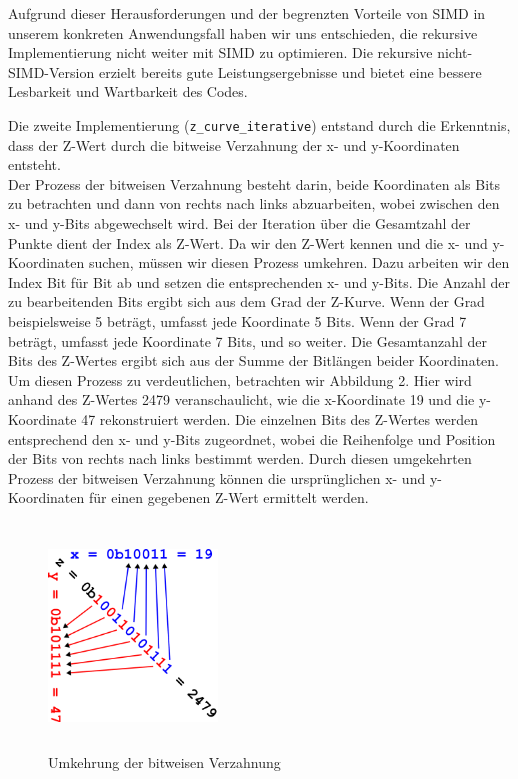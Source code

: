\documentclass[course=erap]{aspdoc}
\begin{document}
\noindent Aufgrund dieser Herausforderungen und der begrenzten Vorteile von SIMD in unserem konkreten Anwendungsfall haben wir uns entschieden, die rekursive Implementierung nicht weiter mit SIMD zu optimieren. Die rekursive nicht-SIMD-Version erzielt bereits gute Leistungsergebnisse und bietet eine bessere Lesbarkeit und Wartbarkeit des Codes.

\noindent Die zweite Implementierung (\texttt{z\_curve\_iterative}) entstand durch die Erkenntnis, dass der Z-Wert durch die bitweise Verzahnung der x- und y-Koordinaten entsteht. \\
Der Prozess der bitweisen Verzahnung besteht darin, beide Koordinaten als Bits zu betrachten und dann von rechts nach links abzuarbeiten, wobei zwischen den x- und y-Bits abgewechselt wird. Bei der Iteration über die Gesamtzahl der Punkte dient der Index als Z-Wert. Da wir den Z-Wert kennen und die x- und y-Koordinaten suchen, müssen wir diesen Prozess umkehren. Dazu arbeiten wir den Index Bit für Bit ab und setzen die entsprechenden x- und y-Bits. Die Anzahl der zu bearbeitenden Bits ergibt sich aus dem Grad der Z-Kurve. Wenn der Grad beispielsweise 5 beträgt, umfasst jede Koordinate 5 Bits. Wenn der Grad 7 beträgt, umfasst jede Koordinate 7 Bits, und so weiter. Die Gesamtanzahl der Bits des Z-Wertes ergibt sich aus der Summe der Bitlängen beider Koordinaten.\\
Um diesen Prozess zu verdeutlichen, betrachten wir Abbildung 2. Hier wird anhand des Z-Wertes 2479 veranschaulicht, wie die x-Koordinate 19 und die y-Koordinate 47 rekonstruiert werden. Die einzelnen Bits des Z-Wertes werden entsprechend den x- und y-Bits zugeordnet, wobei die Reihenfolge und Position der Bits von rechts nach links bestimmt werden. Durch diesen umgekehrten Prozess der bitweisen Verzahnung können die ursprünglichen x- und y-Koordinaten für einen gegebenen Z-Wert ermittelt werden.
\setlength{\parskip}{1em}

\begin{figure}[H]
        \centering
        \includegraphics[width=0.4\textwidth, height=6cm]{resources/bit_interleaving.png}
        \caption{Umkehrung der bitweisen Verzahnung~\cite{nomen4omen}}
        \label{fig:Bit Interleaving}
    \end{figure}
\end{document}
